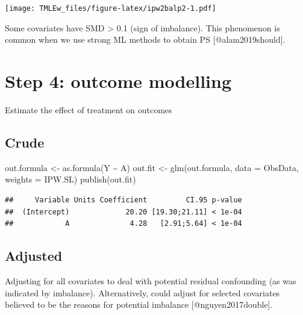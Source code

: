 \documentclass[
]{book}
\newenvironment{Shaded}{\begin{snugshade}}{\end{snugshade}}
\newcommand{\AttributeTok}[1]{\textcolor[rgb]{0.77,0.63,0.00}{#1}}
\newcommand{\FunctionTok}[1]{\textcolor[rgb]{0.00,0.00,0.00}{#1}}
\newcommand{\NormalTok}[1]{#1}
\newcommand{\OtherTok}[1]{\textcolor[rgb]{0.56,0.35,0.01}{#1}}
\newcommand{\SpecialCharTok}[1]{\textcolor[rgb]{0.00,0.00,0.00}{#1}}
\begin{document}
\texttt{[image: TMLEw\_files/figure-latex/ipw2balp2-1.pdf]}

\begin{rmdcomment}
Some covariates have SMD \textgreater{} 0.1 (sign of imbalance). This
phenomenon is common when we use strong ML methods to obtain PS
{[}@alam2019should{]}.
\end{rmdcomment}

\hypertarget{step-4-outcome-modelling-1}{%
\section{Step 4: outcome modelling}\label{step-4-outcome-modelling-1}}

Estimate the effect of treatment on outcomes

\hypertarget{crude}{%
\subsection{Crude}\label{crude}}

\begin{Shaded}
\begin{Highlighting}[]
\NormalTok{out.formula }\OtherTok{\textless{}{-}} \FunctionTok{as.formula}\NormalTok{(Y }\SpecialCharTok{\textasciitilde{}}\NormalTok{ A)}
\NormalTok{out.fit }\OtherTok{\textless{}{-}} \FunctionTok{glm}\NormalTok{(out.formula,}
               \AttributeTok{data =}\NormalTok{ ObsData,}
               \AttributeTok{weights =}\NormalTok{ IPW.SL)}
\FunctionTok{publish}\NormalTok{(out.fit)}
\end{Highlighting}
\end{Shaded}

\begin{verbatim}
##     Variable Units Coefficient         CI.95 p-value 
##  (Intercept)             20.20 [19.30;21.11] < 1e-04 
##            A              4.28   [2.91;5.64] < 1e-04
\end{verbatim}

\hypertarget{adjusted}{%
\subsection{Adjusted}\label{adjusted}}

\begin{rmdcomment}
Adjusting for all covariates to deal with potential residual confounding
(as was indicated by imbalance). Alternatively, could adjust for
selected covariates believed to be the reasons for potential imbalance
{[}@nguyen2017double{]}.
\end{rmdcomment}
\end{document}
